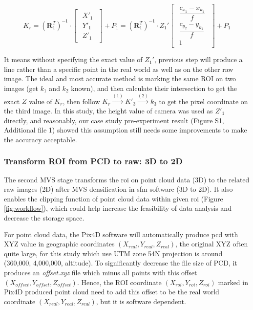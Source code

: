 \documentclass{configs/bmcart}
\begin{document}
$$
  K_r = 
  \left(\mathbf{R}_1^T\right)^{-1} \cdot 
  \begin{bmatrix}
    \begin{matrix}
      X'_1 \\ Y'_1 \\ Z'_1
    \end{matrix}
  \end{bmatrix} + P_1
  =
  \left(\mathbf{R}_1^T\right)^{-1} \cdot Z_1'
  \begin{bmatrix}
    \begin{matrix}
      \dfrac{c_{x_1}- x_{k_1}}{f} \\ \dfrac{c_{y_2} - y_{k_1}}{f} \\ 1
    \end{matrix}
  \end{bmatrix} + P_1
$$

It means without specifying the exact value of $Z_1'$, previous step will produce a line rather than a specific point in the real world as well as on the other raw image. The ideal and most accurate method is marking the same ROI on two images (get $k_1$ and $k_2$ known), and then calculate their intersection to get the exact $Z$ value of $K_r$, then follow $K_r \xrightarrow{(1)} K'_3 \xrightarrow{(2)} k_3$ to get the pixel coordinate on the third image. In this study, the height value of camera was used as $Z'_1$ directly, and reasonably, our case study pre-experiment result (Figure S1, Additional file 1) showed this assumption still needs some improvements to make the accuracy acceptable.

\subsubsection*{Transform ROI from PCD to raw: 3D to 2D}
The second MVS stage transforms the \acrshort*{roi} on point cloud data (3D) to the related raw images (2D) after MVS densification in \acrshort*{sfm} software (3D to 2D). It also enables the clipping function of point cloud data within given \acrshort*{roi} (Figure \ref{fig:workflow}), which could help increase the feasibility of data analysis and decrease the storage space.

For point cloud data, the Pix4D software will automatically produce \acrshort*{pcd} with XYZ value in geographic coordinates $(X_{real}, Y_{real}, Z_{real})$, the original XYZ often quite large, for this study which use UTM zone 54N projection is around (360,000, 4,000,000,  altitude). To significantly decrease the file size of PCD, it produces an \textit{offset.xyz} file which minus all points with this offset $(X_{offset}, Y_{offset}, Z_{offset})$. Hence, the ROI coordinate $(X_{roi}, Y_{roi}, Z_{roi})$ marked in Pix4D produced point cloud need to add this offset to be the real world coordinate $(X_{real}, Y_{real}, Z_{real})$, but it is software dependent.
\end{document}
